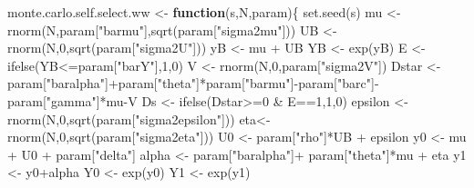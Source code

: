 \documentclass[
]{book}
\newenvironment{Shaded}{\begin{snugshade}}{\end{snugshade}}
\newcommand{\ControlFlowTok}[1]{\textcolor[rgb]{0.13,0.29,0.53}{\textbf{#1}}}
\newcommand{\DecValTok}[1]{\textcolor[rgb]{0.00,0.00,0.81}{#1}}
\newcommand{\FunctionTok}[1]{\textcolor[rgb]{0.00,0.00,0.00}{#1}}
\newcommand{\NormalTok}[1]{#1}
\newcommand{\OtherTok}[1]{\textcolor[rgb]{0.56,0.35,0.01}{#1}}
\newcommand{\SpecialCharTok}[1]{\textcolor[rgb]{0.00,0.00,0.00}{#1}}
\newcommand{\StringTok}[1]{\textcolor[rgb]{0.31,0.60,0.02}{#1}}
\theoremstyle{definition}
\theoremstyle{definition}
\theoremstyle{definition}
\theoremstyle{definition}
\theoremstyle{remark}
\begin{document}
\begin{Shaded}
\begin{Highlighting}[]
\NormalTok{monte.carlo.self.select.ww }\OtherTok{\textless{}{-}} \ControlFlowTok{function}\NormalTok{(s,N,param)\{}
  \FunctionTok{set.seed}\NormalTok{(s)}
\NormalTok{  mu }\OtherTok{\textless{}{-}} \FunctionTok{rnorm}\NormalTok{(N,param[}\StringTok{"barmu"}\NormalTok{],}\FunctionTok{sqrt}\NormalTok{(param[}\StringTok{"sigma2mu"}\NormalTok{]))}
\NormalTok{  UB }\OtherTok{\textless{}{-}} \FunctionTok{rnorm}\NormalTok{(N,}\DecValTok{0}\NormalTok{,}\FunctionTok{sqrt}\NormalTok{(param[}\StringTok{"sigma2U"}\NormalTok{]))}
\NormalTok{  yB }\OtherTok{\textless{}{-}}\NormalTok{ mu }\SpecialCharTok{+}\NormalTok{ UB }
\NormalTok{  YB }\OtherTok{\textless{}{-}} \FunctionTok{exp}\NormalTok{(yB)}
\NormalTok{  E }\OtherTok{\textless{}{-}} \FunctionTok{ifelse}\NormalTok{(YB}\SpecialCharTok{\textless{}=}\NormalTok{param[}\StringTok{"barY"}\NormalTok{],}\DecValTok{1}\NormalTok{,}\DecValTok{0}\NormalTok{)}
\NormalTok{  V }\OtherTok{\textless{}{-}} \FunctionTok{rnorm}\NormalTok{(N,}\DecValTok{0}\NormalTok{,param[}\StringTok{"sigma2V"}\NormalTok{])}
\NormalTok{  Dstar }\OtherTok{\textless{}{-}}\NormalTok{ param[}\StringTok{"baralpha"}\NormalTok{]}\SpecialCharTok{+}\NormalTok{param[}\StringTok{"theta"}\NormalTok{]}\SpecialCharTok{*}\NormalTok{param[}\StringTok{"barmu"}\NormalTok{]}\SpecialCharTok{{-}}\NormalTok{param[}\StringTok{"barc"}\NormalTok{]}\SpecialCharTok{{-}}\NormalTok{param[}\StringTok{"gamma"}\NormalTok{]}\SpecialCharTok{*}\NormalTok{mu}\SpecialCharTok{{-}}\NormalTok{V}
\NormalTok{  Ds }\OtherTok{\textless{}{-}} \FunctionTok{ifelse}\NormalTok{(Dstar}\SpecialCharTok{\textgreater{}=}\DecValTok{0} \SpecialCharTok{\&}\NormalTok{ E}\SpecialCharTok{==}\DecValTok{1}\NormalTok{,}\DecValTok{1}\NormalTok{,}\DecValTok{0}\NormalTok{)}
\NormalTok{  epsilon }\OtherTok{\textless{}{-}} \FunctionTok{rnorm}\NormalTok{(N,}\DecValTok{0}\NormalTok{,}\FunctionTok{sqrt}\NormalTok{(param[}\StringTok{"sigma2epsilon"}\NormalTok{]))}
\NormalTok{  eta}\OtherTok{\textless{}{-}} \FunctionTok{rnorm}\NormalTok{(N,}\DecValTok{0}\NormalTok{,}\FunctionTok{sqrt}\NormalTok{(param[}\StringTok{"sigma2eta"}\NormalTok{]))}
\NormalTok{  U0 }\OtherTok{\textless{}{-}}\NormalTok{ param[}\StringTok{"rho"}\NormalTok{]}\SpecialCharTok{*}\NormalTok{UB }\SpecialCharTok{+}\NormalTok{ epsilon}
\NormalTok{  y0 }\OtherTok{\textless{}{-}}\NormalTok{ mu }\SpecialCharTok{+}\NormalTok{  U0 }\SpecialCharTok{+}\NormalTok{ param[}\StringTok{"delta"}\NormalTok{]}
\NormalTok{  alpha }\OtherTok{\textless{}{-}}\NormalTok{ param[}\StringTok{"baralpha"}\NormalTok{]}\SpecialCharTok{+}\NormalTok{  param[}\StringTok{"theta"}\NormalTok{]}\SpecialCharTok{*}\NormalTok{mu }\SpecialCharTok{+}\NormalTok{ eta}
\NormalTok{  y1 }\OtherTok{\textless{}{-}}\NormalTok{ y0}\SpecialCharTok{+}\NormalTok{alpha}
\NormalTok{  Y0 }\OtherTok{\textless{}{-}} \FunctionTok{exp}\NormalTok{(y0)}
\NormalTok{  Y1 }\OtherTok{\textless{}{-}} \FunctionTok{exp}\NormalTok{(y1)}
  

\end{Highlighting}
\end{Shaded}
\end{document}
